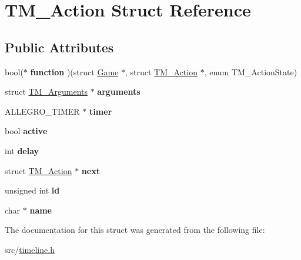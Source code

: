 \hypertarget{structTM__Action}{\section{\-T\-M\-\_\-\-Action \-Struct \-Reference}
\label{structTM__Action}
}
\subsection*{\-Public \-Attributes}
\begin{DoxyCompactItemize}
\item 
\hypertarget{structTM__Action_a7935399aa8077d154e7d1ce64f5a13c5}{bool($\ast$ {\bfseries function} )(struct \hyperlink{structGame}{\-Game} $\ast$, struct \hyperlink{structTM__Action}{\-T\-M\-\_\-\-Action} $\ast$, enum \-T\-M\-\_\-\-Action\-State)}\label{structTM__Action_a7935399aa8077d154e7d1ce64f5a13c5}

\item 
\hypertarget{structTM__Action_a061dfb7f5496731aaf448a04491263ac}{struct \hyperlink{structTM__Arguments}{\-T\-M\-\_\-\-Arguments} $\ast$ {\bfseries arguments}}\label{structTM__Action_a061dfb7f5496731aaf448a04491263ac}

\item 
\hypertarget{structTM__Action_adf47bc086ee38527104d0113fab58386}{\-A\-L\-L\-E\-G\-R\-O\-\_\-\-T\-I\-M\-E\-R $\ast$ {\bfseries timer}}\label{structTM__Action_adf47bc086ee38527104d0113fab58386}

\item 
\hypertarget{structTM__Action_a6ff56cc7060fa2369a3879b4244180e7}{bool {\bfseries active}}\label{structTM__Action_a6ff56cc7060fa2369a3879b4244180e7}

\item 
\hypertarget{structTM__Action_a73181b4f19f197b992ed98d11d3964a8}{int {\bfseries delay}}\label{structTM__Action_a73181b4f19f197b992ed98d11d3964a8}

\item 
\hypertarget{structTM__Action_a86d8200abe82ba1359340b6dc2e5ac5f}{struct \hyperlink{structTM__Action}{\-T\-M\-\_\-\-Action} $\ast$ {\bfseries next}}\label{structTM__Action_a86d8200abe82ba1359340b6dc2e5ac5f}

\item 
\hypertarget{structTM__Action_ac0e11136dc5327f709d82e8d417bb088}{unsigned int {\bfseries id}}\label{structTM__Action_ac0e11136dc5327f709d82e8d417bb088}

\item 
\hypertarget{structTM__Action_a2c6ba822db618531770d3c834fb4ec8a}{char $\ast$ {\bfseries name}}\label{structTM__Action_a2c6ba822db618531770d3c834fb4ec8a}

\end{DoxyCompactItemize}


\-The documentation for this struct was generated from the following file\-:\begin{DoxyCompactItemize}
\item 
src/\hyperlink{timeline_8h}{timeline.\-h}\end{DoxyCompactItemize}
